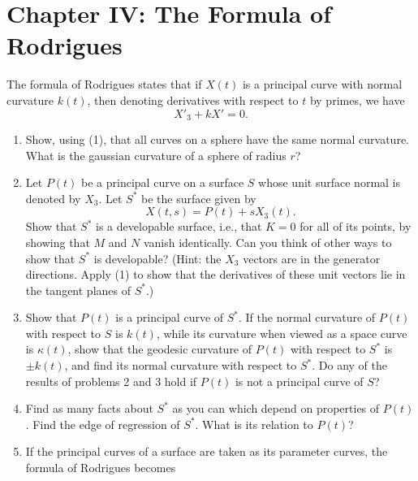 \documentclass{book}
\begin{document}
\chapter*{Chapter IV: The Formula of Rodrigues}

\setcounter{equation}{0}

The formula of Rodrigues states that if $X(t)$ is a principal curve with normal curvature $k(t)$, then denoting derivatives with respect to $t$ by primes, we have
\begin{equation}
X'_{3} + kX' = 0.
\end{equation}

\begin{enumerate}[1.]
  \item Show, using (1), that all curves on a sphere have the same normal curvature. What is the gaussian curvature of a sphere of radius $r$?
  \item Let $P(t)$ be a principal curve on a surface $S$ whose unit surface normal is denoted by $X_{3}$. Let $S^{*}$ be the surface given by
    \begin{equation}
      X(t,s) = P(t) + sX_{3}(t).
    \end{equation}
  Show that $S^{*}$ is a developable surface, i.e., that $K = 0$ for all of its points, by showing that $M$ and $N$ vanish identically. Can you think of other ways to show that $S^{*}$ is developable? (Hint: the $X_{3}$ vectors are in the generator directions. Apply (1) to show that the derivatives of these unit vectors lie in the tangent planes of $S^{*}$.)
  \item Show that $P(t)$ is a principal curve of $S^{*}$. If the normal curvature of $P(t)$ with respect to $S$ is $k(t)$, while its curvature when viewed as a space curve is $\kappa (t)$, show that the geodesic curvature of $P(t)$ with respect to $S^{*}$ is $\pm k(t)$, and find its normal curvature with respect to $S^{*}$. Do any of the results of problems 2 and 3 hold if $P(t)$ is not a principal curve of $S$?
  \item Find as many facts about $S^{*}$ as you can which depend on properties of $P(t)$. Find the edge of regression of $S^{*}$. What is its relation to $P(t)$?
  \item If the principal curves of a surface are taken as its parameter curves, the formula of Rodrigues becomes
    \begin{equation}

\end{equation}
\end{enumerate}
\end{document}
